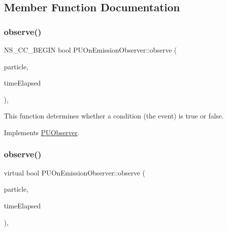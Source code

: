 \subsection{Member Function Documentation}
\mbox{\label{classPUOnEmissionObserver_a8e44d09b84802c78a7cbe671a104962c}} 
\subsubsection{\texorpdfstring{observe()}{observe()}\hspace{0.1cm}{\footnotesize\ttfamily [1/2]}}
{\footnotesize\ttfamily N\+S\+\_\+\+C\+C\+\_\+\+B\+E\+G\+IN bool P\+U\+On\+Emission\+Observer\+::observe (\begin{DoxyParamCaption}\item[{\hyperlink{structPUParticle3D}{P\+U\+Particle3D} $\ast$}]{particle,  }\item[{float}]{time\+Elapsed }\end{DoxyParamCaption})\hspace{0.3cm}{\ttfamily [override]}, {\ttfamily [virtual]}}

This function determines whether a condition (the event) is true or false. 

Implements \hyperlink{classPUObserver_a50f59cc3245e291b641463db5d3037f7}{P\+U\+Observer}.

\mbox{\label{classPUOnEmissionObserver_a943d4b27b5a19b1918a0f7877c5dffb2}} 
\subsubsection{\texorpdfstring{observe()}{observe()}\hspace{0.1cm}{\footnotesize\ttfamily [2/2]}}
{\footnotesize\ttfamily virtual bool P\+U\+On\+Emission\+Observer\+::observe (\begin{DoxyParamCaption}\item[{\hyperlink{structPUParticle3D}{P\+U\+Particle3D} $\ast$}]{particle,  }\item[{float}]{time\+Elapsed }\end{DoxyParamCaption})\hspace{0.3cm}{\ttfamily [override]}, {\ttfamily [virtual]}}

